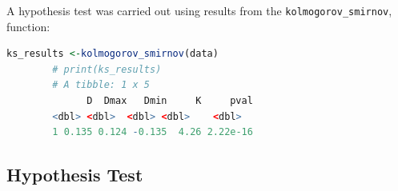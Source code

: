 \documentclass[12pt,letterpaper]{article}
\begin{document}
  

	A hypothesis test was carried out using results from the \texttt{kolmogorov\_smirnov}, function:

	\begin{lstlisting}[language=R]
		ks_results <-kolmogorov_smirnov(data)
		# print(ks_results)
		# A tibble: 1 x 5
		      D  Dmax   Dmin     K     pval
  		<dbl> <dbl>  <dbl> <dbl>    <dbl>
		1 0.135 0.124 -0.135  4.26 2.22e-16
	\end{lstlisting}

	\subsection*{Hypothesis Test}
\end{document}
